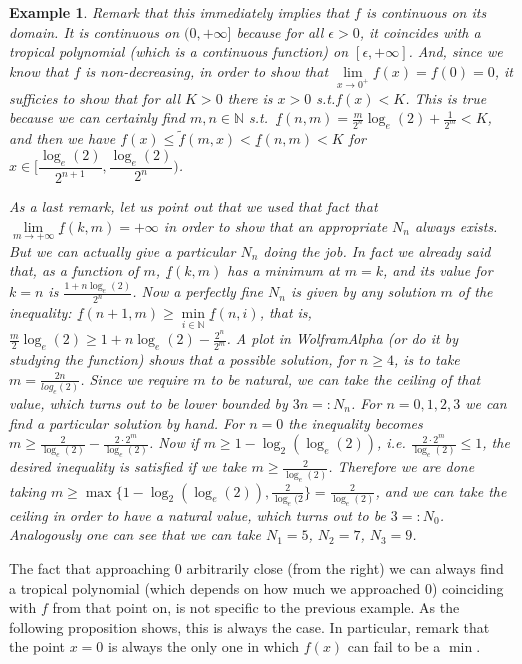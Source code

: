 \documentclass[submission,copyright,creativecommons]{eptcs}
\newtheorem{Example}[theorem]{Example}
\newcommand{\N}{\mathbb{N}}
\newcommand{\set}[1]{\{#1\}}
\begin{document}
\begin{Example}
Remark that this immediately implies that $f$  is continuous on its domain.
It is continuous on $(0,+\infty]$ because for all $\epsilon>0$, it coincides with a tropical polynomial (which is a continuous function) on $[\epsilon,+\infty]$.
And, since we know that $f$ is non-decreasing, in order to show that $\lim\limits_{x\rightarrow 0^+} f(x) = f(0) = 0$, it sufficies to show that for all $K>0$ there is $x>0$ s.t.$f(x)<K$.
This is true because we can certainly find $m,n\in\N$ s.t.\ $\underline f (n,m)=\frac{m}{2^n}\log_e(2)+\frac{1}{2^{m}}<K$, and then we have $f(x)\leq \widetilde f(m,x) < \underline f (n,m)<K$ for $x\in [\dfrac{\log_e(2)}{2^{n+1}},\dfrac{\log_e(2)}{2^{n}})$.

As a last remark, let us point out that we used that fact that $\lim\limits_{m\to+\infty} \underline f (k,m) = +\infty$ in order to show that an appropriate $N_n$ always exists.
But we can actually give a particular $N_n$ doing the job.
In fact we already said that, as a function of $m$, $\underline f(k,m)$ has a minimum at $m=k$, and its value for $k=n$ is $\frac{1+n\log_e(2)}{2^n}$.
Now a perfectly fine $N_n$ is given by any solution $m$ of the inequality:
$\underline f (n+1,m) \geq \min\limits_{i\in\N} \underline f(n,i)$, that is,
$\frac{m}{2}\log_e(2)\geq 1+n\log_e(2)-\frac{2^n}{2^m}$.
A plot in WolframAlpha (or do it by studying the function) shows that a possible solution, for $n\geq 4$, is to take $m=\frac{2n}{log_e(2)}$.
Since we require $m$ to be natural, we can take the ceiling of that value, which turns out to be lower bounded by $3n=:N_n$.
For $n=0,1,2,3$ we can find a particular solution by hand.
For $n=0$ the inequality becomes
$m\geq \frac{2}{\log_e(2)}-\frac{2\cdot 2^m}{\log_e(2)}$.
Now if $m\geq 1-\log_2(\log_e(2))$, i.e. $\frac{2\cdot 2^m}{\log_e(2)}\leq 1$, the desired inequality is satisfied if we take $m\geq \frac{2}{\log_e(2)}$.
Therefore we are done taking $m\geq \max\set{1-\log_2(\log_e(2)),\frac{2}{\log_e(2}}=\frac{2}{\log_e(2)}$, and we can take the ceiling in order to have a natural value, which turns out to be $3=:N_0$.
Analogously one can see that we can take $N_1=5$, $N_2=7$, $N_3=9$.
\end{Example}

The fact that approaching $0$ arbitrarily close (from the right) we can always find a tropical polynomial (which depends on how much we approached $0$) coinciding with $f$ from that point on, is not specific to the previous example.
As the following proposition shows, this is always the case.
In particular, remark that the point $x=0$ is always the only one in which $f(x)$ can fail to be a $\min$.
\end{document}
